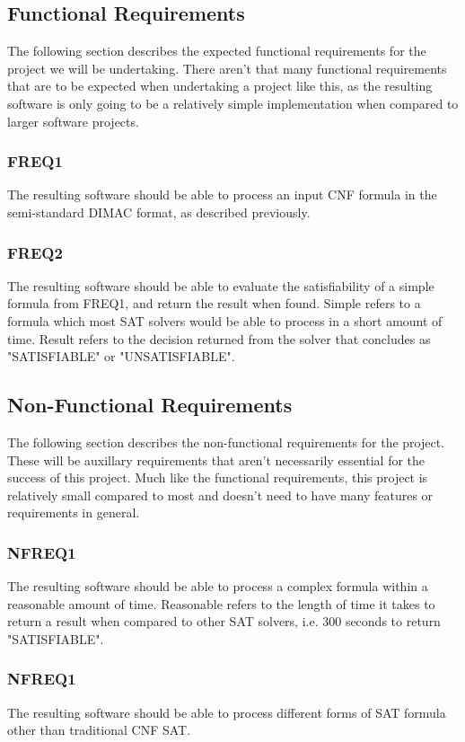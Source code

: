 \documentclass{article}
\begin{document}
\subsection{Functional Requirements}
The following section describes the expected functional requirements for the project we will be undertaking. There aren't that many
functional requirements that are to be expected when undertaking a project like this, as the resulting software is only going to be a
relatively simple implementation when compared to larger software projects.

    \subsubsection{FREQ1}
    The resulting software should be able to process an input CNF formula in the semi-standard DIMAC format, as described previously.

    \subsubsection{FREQ2}
    The resulting software should be able to evaluate the satisfiability of a simple formula from FREQ1, and return the result
    when found. Simple refers to a formula which most SAT solvers would be able to process in a short amount of time. Result refers to the
    decision returned from the solver that concludes as "SATISFIABLE" or "UNSATISFIABLE".

\subsection{Non-Functional Requirements}
The following section describes the non-functional requirements for the project. These will be auxillary requirements that aren't
necessarily essential for the success of this project. Much like the functional requirements, this project is relatively small compared to
most and doesn't need to have many features or requirements in general.

    \subsubsection{NFREQ1}
    The resulting software should be able to process a complex formula within a reasonable amount of time. Reasonable refers to the length
    of time it takes to return a result when compared to other SAT solvers, i.e. 300 seconds to return "SATISFIABLE".

    \subsubsection{NFREQ1}
    The resulting software should be able to process different forms of SAT formula other than traditional CNF SAT.
\end{document}
